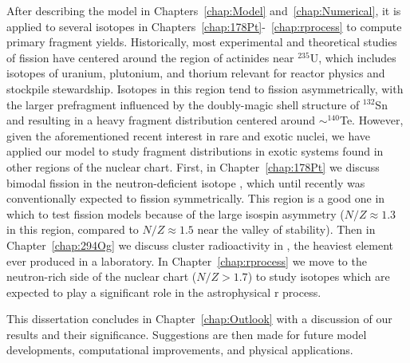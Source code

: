 After describing the model in Chapters~\ref{chap:Model} and~\ref{chap:Numerical}, it is applied to several isotopes in Chapters~\ref{chap:178Pt}-~\ref{chap:rprocess} to compute primary fragment yields. Historically, most experimental and theoretical studies of fission have centered around the region of actinides near $^{235}$U, which includes isotopes of uranium, plutonium, and thorium relevant for reactor physics and stockpile stewardship. Isotopes in this region tend to fission asymmetrically, with the larger prefragment influenced by the doubly-magic shell structure of $^{132}$Sn and resulting in a heavy fragment distribution centered around ${\sim}^{140}$Te. However, given the aforementioned recent interest in rare and exotic nuclei, we have applied our model to study fragment distributions in exotic systems found in other regions of the nuclear chart. First, in Chapter~\ref{chap:178Pt} we discuss bimodal fission in the neutron-deficient isotope {\Pt}, which until recently was conventionally expected to fission symmetrically. This region is a good one in which to test fission models because of the large isospin asymmetry ($N/Z\approx1.3$ in this region, compared to $N/Z\approx1.5$ near the valley of stability). Then in Chapter~\ref{chap:294Og} we discuss cluster radioactivity in {\Og}, the heaviest element ever produced in a laboratory. In Chapter~\ref{chap:rprocess} we move to the neutron-rich side of the nuclear chart ($N/Z>1.7$) to study isotopes which are expected to play a significant role in the astrophysical r process. %



This dissertation concludes in Chapter~\ref{chap:Outlook} with a discussion of our results and their significance. Suggestions are then made for future model developments, computational improvements, and physical applications.
